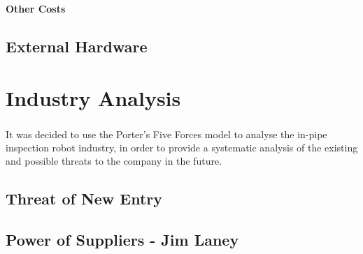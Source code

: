 \documentclass[11pt]{article}		%
\begin{document}
        \textbf{Other Costs}\\




		\subsection{External Hardware}
			
	\section{Industry Analysis}
		
		It was decided to use the Porter's Five Forces model\textsuperscript{\cite{porter2008five}} to analyse the in-pipe inspection robot industry, in order to provide a systematic analysis of the existing and possible threats to the company in the future.
		
		\subsection[Threat of New Entry]{Threat of New Entry}
				
		\subsection[Power of Suppliers]{Power of Suppliers - Jim Laney}
			
\end{document}
